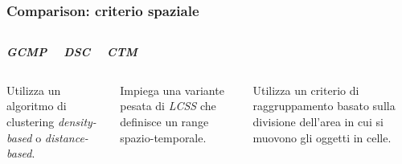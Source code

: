 \documentclass{beamer}
\begin{document}
\begin{frame}
		\frametitle{Comparison: criterio spaziale}
		\begin{columns}
			
			\begin{center}
				\textbf{\textit{\huge{GCMP}}}
				
			\end{center}
		
		\begin{center}
			\textbf{\textit{\huge{DSC}}}
			
		\end{center}
	
	\begin{center}
		\textbf{\textit{\huge{CTM}}}
		
	\end{center}
		\end{columns}
		\begin{columns}
			
			\column{.3\columnwidth}
			
			Utilizza un algoritmo di clustering 
			\textit{density-based} o \textit{distance-based}.
		
			
				\column{.3\textwidth}
		
			Impiega una variante pesata di \textit{LCSS} che definisce un range spazio-temporale.
			
				\column{.3\textwidth}
			    
				Utilizza un criterio di raggruppamento basato sulla divisione dell'area
				in cui si muovono gli oggetti in celle.
		\end{columns}
	\end{frame}     
\end{document}
